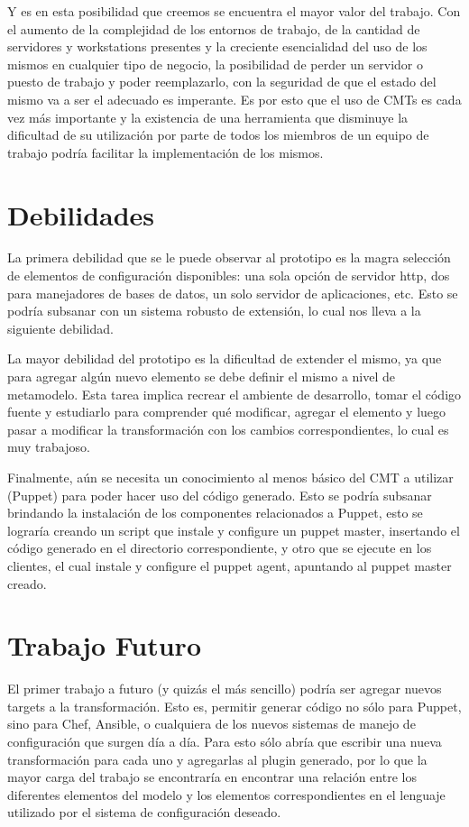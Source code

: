 Y es en esta posibilidad que creemos se encuentra el mayor valor del trabajo. Con el aumento de la complejidad de los entornos de trabajo, de la cantidad de servidores y workstations presentes y la creciente esencialidad del uso de los mismos en cualquier tipo de negocio, la posibilidad de perder un servidor o puesto de trabajo y poder reemplazarlo, con la seguridad de que el estado del mismo va a ser el adecuado es imperante. Es por esto que el uso de CMTs es cada vez más importante y la existencia de una herramienta que disminuye la dificultad de su utilización por parte de todos los miembros de un equipo de trabajo podría facilitar la implementación de los mismos.

\section{Debilidades}
La primera debilidad que se le puede observar al prototipo es la magra selección de elementos de configuración disponibles: una sola opción de servidor http, dos para manejadores de bases de datos, un solo servidor de aplicaciones, etc. Esto se podría subsanar con un sistema robusto de extensión, lo cual nos lleva a la siguiente debilidad.

La mayor debilidad del prototipo es la dificultad de extender el mismo, ya que para agregar algún nuevo elemento se debe definir el mismo a nivel de metamodelo. Esta tarea implica recrear el ambiente de desarrollo, tomar el código fuente y estudiarlo para comprender qué modificar, agregar el elemento y luego pasar a modificar la transformación con los cambios correspondientes, lo cual es muy trabajoso.

Finalmente, aún se necesita un conocimiento al menos básico del CMT a utilizar (Puppet) para poder hacer uso del código generado. Esto se podría subsanar brindando la instalación de los componentes relacionados a Puppet, esto se lograría creando un script que instale y configure un puppet master, insertando el código generado en el directorio correspondiente, y otro que se ejecute en los clientes, el cual instale y configure el puppet agent, apuntando al puppet master creado. 

\section{Trabajo Futuro} \label{Trabajo a futuro}
El primer trabajo a futuro (y quizás el más sencillo) podría ser agregar nuevos targets a la transformación. Esto es, permitir generar código no sólo para Puppet, sino para Chef, Ansible, o cualquiera de los nuevos sistemas de manejo de configuración que surgen día a día. Para esto sólo abría que escribir una nueva transformación para cada uno y agregarlas al plugin generado, por lo que la mayor carga del trabajo se encontraría en encontrar una relación entre los diferentes elementos del modelo y los elementos correspondientes en el lenguaje utilizado por el sistema de configuración deseado.

